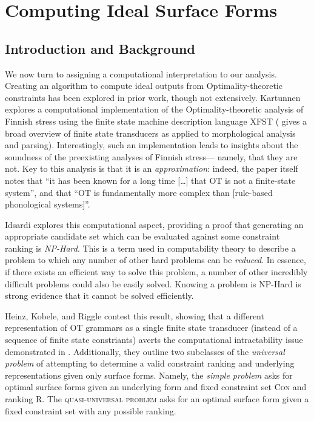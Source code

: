 \documentclass[12pt]{article}
\begin{document}
\pagebreak

\section{Computing Ideal Surface Forms}

\subsection{Introduction and Background}

We now turn to assigning a computational interpretation to our analysis.
Creating an algorithm to compute ideal outputs from Optimality-theoretic
constraints has been explored in prior work, though not extensively. Kartunnen
\cite{karttunen2006finite} explores a computational implementation of the
Optimality-theoretic analysis of Finnish stress using the finite state machine
description language XFST (\cite{karttunen2001applications} gives a broad
overview of finite state transducers as applied to morphological analysis and
parsing). Interestingly, such an implementation leads to insights about the
soundness of the preexisting analyses of Finnish stress--- namely, that they
are not. Key to this analysis is that it is an \textit{approximation}: indeed,
the paper itself notes that ``it has been known for a long time [\ldots] that
\textsc{OT} is not a finite-state system'', and that ``\textsc{OT} is
fundamentally more complex than [rule-based phonological systems]''.

Idsardi \cite{idsardi2006simple} explores this computational aspect, providing
a proof that generating an appropriate candidate set which can be evaluated
against some constraint ranking is \textit{NP-Hard}. This is a term used in
computability theory to describe a problem to which any number of other hard
problems can be \textit{reduced}. In essence, if there exists an efficient way
to solve this problem, a number of other incredibly difficult problems could
also be easily solved. Knowing a problem is NP-Hard is strong evidence that it
cannot be solved efficiently.

Heinz, Kobele, and Riggle \cite{heinz2009evaluating} contest this result,
showing that a different representation of \textsc{OT} grammars as a single
finite state transducer (instead of a sequence of finite state constriants)
averts the computational intractability issue demonstrated in
\cite{idsardi2006simple}. Additionally, they outline two subclasses of the
\textit{universal problem} of attempting to determine a valid constraint
ranking and underlying representations given only surface forms. Namely,
the \textit{simple problem} asks for optimal surface forms given an underlying
form and fixed constraint set \textsc{Con} and ranking \textsc{R}. The
\textsc{quasi-universal problem} asks for an optimal surface form given
a fixed constraint set with any possible ranking.
\end{document}
